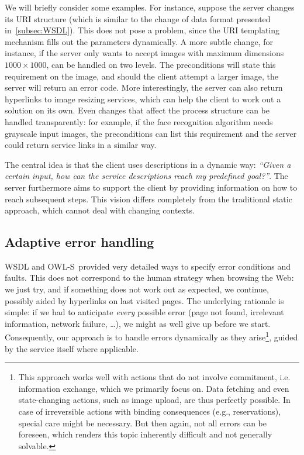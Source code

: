 \documentclass[smallextended]{svjour3}
\newcommand{\owls}{\mbox{OWL-S}}
\begin{document}
{We will briefly consider some examples. For instance, suppose the server changes its URI structure (which is similar to the change of data format presented in~\ref{subsec:WSDL}). This does not pose a problem, since the URI templating mechanism fills out the parameters dynamically. A more subtle change, for instance, if the server only wants to accept images with maximum dimensions $1000 \times 1000$, can be handled on two levels. The preconditions will state this requirement on the image, and should the client attempt a larger image, the server will return an error code. More interestingly, the server can also return hyperlinks to image resizing services, which can help the client to work out a solution on its own. Even changes that affect the process structure can be handled transparently: for example, if the face recognition algorithm needs grayscale input images, the preconditions can list this requirement and the server could return service links in a similar way.

The central idea is that the client uses descriptions in a dynamic way: \emph{``Given a certain input, how can the service descriptions reach my predefined goal?''}. The server furthermore aims to support the client by providing information on how to reach subsequent steps. This vision differs completely from the traditional static approach, which cannot deal with changing contexts.

\subsection{Adaptive error handling}
WSDL and \owls\ provided very detailed ways to specify error conditions and faults. This does not correspond to the human strategy when browsing the Web: we just try, and if something does not work out as expected, we continue, possibly aided by hyperlinks on last visited pages. The underlying rationale is simple: if we had to anticipate \emph{every} possible error (page not found, irrelevant information, network failure, \ldots), we might as well give up before we start. Consequently, our approach is to handle errors dynamically as they arise\footnote{This approach works well with actions that do not involve commitment, i.e. information exchange, which we primarily focus on. Data fetching and even state-changing actions, such as image upload, are thus perfectly possible. In case of irreversible actions with binding consequences (e.g., reservations), special care might be necessary. But then again, not all errors can be foreseen, which renders this topic inherently difficult and not generally solvable.}, guided by the service itself where applicable.

}
\end{document}
